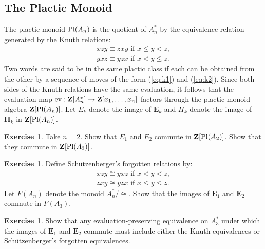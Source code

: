 \documentclass[11pt]{amsart}
\theoremstyle{definition}
\theoremstyle{example}
\newtheorem{exercise}[theorem]{Exercise}
\newcommand{\ev}{\textup{ev}}
\newcommand{\pl}{\textup{Pl}}
\begin{document}
\subsection{The Plactic Monoid}
\label{sec:plactic-monoid}
The plactic monoid $\pl(A_n)$ is the quotient of $A^*_n$ by the equivalence relation generated by the Knuth relations:
\begin{gather}
  \tag{$K1$}\label{eq:k1}
  xzy \equiv zxy \text{ if } x\leq y < z,
  \\
  \tag{$K2$}\label{eq:k2}
  yxz \equiv yzx \text{ if } x < y \leq z.
\end{gather}
Two words are said to be in the same plactic class if each can be obtained from the other by a sequence of moves of the form (\ref{eq:k1}) and (\ref{eq:k2}).
Since both sides of the Knuth relations have the same evaluation, it follows that the evaluation map $\ev:\mathbf Z[A^*_n]\to \mathbf Z[x_1,\dotsc,x_n]$ factors through the plactic monoid algebra $\mathbf Z[\pl(A_n)]$.
Let $E_k$ denote the image of $\mathbf E_k$ and $H_k$ denote the image of $\mathbf H_k$ in $\mathbf Z[\pl(A_n)]$.
\begin{exercise}
  Take $n=2$.
  Show that $E_1$ and $E_2$ commute in $\mathbf Z[\pl(A_2)]$.
  Show that they commute in $\mathbf Z[\pl(A_3)]$.
\end{exercise}
\begin{exercise}
  \label{exercise:forgotten}
  Define Sch\"utzenberger's forgotten relations by:
  \begin{gather}
    \tag{$F1$}\label{eq:f1}
    xzy \cong yxz \text{ if } x < y < z,
    \\
    \tag{$F2$}\label{eq:f2}
    zxy \cong yzx \text{ if } x \leq y \leq z.
  \end{gather}
  Let $F(A_n)$ denote the monoid $A_n^*/\cong$.
  Show that the images of $\mathbf E_1$ and $\mathbf E_2$ commute in $F(A_3)$.
\end{exercise}
\begin{exercise}
  Show that any evaluation-preserving equivalence on $A_3^*$ under which the images of $\mathbf E_1$ and $\mathbf E_2$ commute must include either the Knuth equivalences or Sch\"utzenberger's forgotten equivalences.
\end{exercise}
\end{document}
